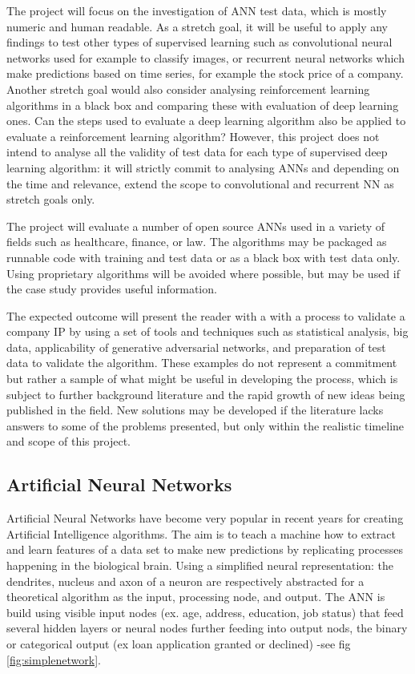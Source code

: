 \documentclass[proposal]{softeng}
\begin{document}
The project will focus on the investigation of ANN test data, which is mostly numeric and human readable. As a stretch goal, it will be useful to apply any findings to test other types of supervised learning such as convolutional neural networks used for example to classify images, or recurrent neural networks which make predictions based on time series, for example the stock price of a company. Another stretch goal would also consider analysing reinforcement learning algorithms in a black box and comparing these with evaluation of deep learning ones. Can the steps used to evaluate a deep learning algorithm also be applied to evaluate a reinforcement learning algorithm? However, this project does not intend to analyse all the validity of test data for each type of supervised deep learning algorithm: it will strictly commit to analysing ANNs and depending on the time and relevance, extend the scope to convolutional and recurrent NN as stretch goals only.

The project will evaluate a number of open source ANNs used in a variety of fields such as healthcare, finance, or law. The algorithms may be packaged as runnable code with training and test data or as a black box with test data only. Using proprietary algorithms will be avoided where possible, but may be used if the case study provides useful information. 

The expected outcome will present the reader with a with a process to validate a company IP by using a set of tools and techniques such as statistical analysis, big data, applicability of generative adversarial networks, and preparation of test data to validate the algorithm.  These examples do not represent a commitment but rather a sample of what might be useful in developing the process, which  is subject to further background literature and the rapid growth of new ideas being published in the field. New solutions may be developed if the literature lacks answers to some of the problems presented, but only within the realistic timeline and scope of this project.


\subsection{Artificial Neural Networks}

Artificial Neural Networks have become very popular in recent years for creating Artificial Intelligence algorithms. The aim is to teach a machine how to extract and learn features of a data set to make new predictions by replicating processes happening in the biological brain. Using a simplified neural representation: the dendrites, nucleus and axon of a neuron are respectively abstracted for a theoretical algorithm as the input, processing node, and output. The ANN is build using visible input nodes (ex. age, address, education, job status) that feed several hidden layers or neural nodes further feeding into output nods, the binary or categorical output (ex loan application granted or declined) -see fig \ref{fig:simplenetwork}.
\end{document}
